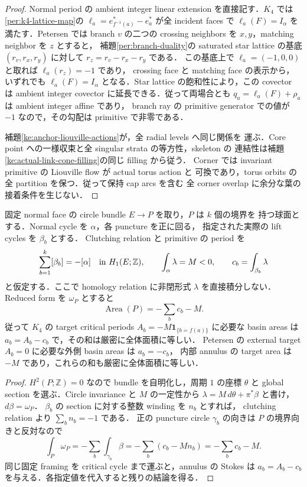 \begin{proof}
Normal period の ambient integer linear extension を直接記す．$K_4$ では
\eqref{per:k4-lattice-map}の
$\ell_a=e^*_{f^{-1}(a)}-e^*_a$ が全 incident faces で
$\ell_a(F)=I_\alpha$ を満たす．Petersen では branch $v$ の二つの crossing
neighbors を $x,y$，matching neighbor を $z$ とすると，
補題\ref{per:branch-duality}の saturated star lattice の基底
$(r_v,r_x,r_y)$ に対して $r_z=r_v-r_x-r_y$ である．
この基底上で $\ell_a=(-1,0,0)$ と取れば $\ell_a(r_z)=-1$ であり，
crossing face と matching face の表示から，いずれでも
$\ell_a(F)=I_\alpha$ となる．Star lattice の飽和性により，この covector は
ambient integer covector に延長できる．従って両場合とも
$q_a=\ell_a(F)+\rho_a$ は ambient integer affine であり，
branch ray の primitive generator での値が $-1$ なので，その勾配は primitive
で非零である．

補題\ref{ke:anchor-liouville-actions}が，全 radial levels へ同じ関係を
運ぶ．Core point への一様収束と全 singular strata の等方性，skeleton の
連結性は補題\ref{ke:actual-link-cone-filling}の同じ filling から従う．
Corner では invariant primitive の Liouville flow が actual torus action と
可換であり，torus orbits の全 partition を保つ．従って保持 cap arcs を含む
全 corner overlap に余分な葉の接着条件を生じない．
\end{proof}

\begin{lemma}
\label{ke:anchor-stokes-budget}
固定 normal face の circle bundle $E\to P$ を取り，$P$ は $k$ 個の境界を
持つ球面とする．Normal cycle を $\alpha$，各 puncture を正に回る，
指定された実際の lift cycles を $\beta_b$ とする．
Clutching relation と primitive の period を
\[
 \sum_{b=1}^k[\beta_b]=-[\alpha]\quad\hbox{in }H_1(E;\mathbb Z),
 \qquad \int_\alpha\lambda=M<0,\qquad
 c_b=\int_{\beta_b}\lambda
\]
と仮定する．ここで homology relation に非閉形式 $\lambda$ を直接積分しない．
Reduced form を $\omega_P$ とすると
\begin{equation}\label{ke:eq:anchor-area-total}
 \operatorname{Area}(P)=-\sum_bc_b-M.
\end{equation}
従って $K_4$ の target critical periods
$A_b=-M\mathbf1_{\{b=f(a)\}}$ に必要な basin areas は
$a_b=A_b-c_b$ で，その和は厳密に全体面積に等しい．
Petersen の external target $A_b=0$ に必要な外側 basin areas は $a_b=-c_b$，
内部 annulus の target area は $-M$ であり，これらの和も厳密に全体面積に等しい．
\end{lemma}

\begin{proof}
$H^2(P;\mathbb Z)=0$ なので bundle を自明化し，周期 $1$ の座標 $\theta$ と
global section を選ぶ．Circle invariance と $M$ の一定性から
$\lambda=M\,d\theta+\pi^*\beta$ と書け，$d\beta=\omega_P$．
$\beta_b$ の section に対する整数 winding を $n_b$ とすれば，
clutching relation より $\sum_bn_b=-1$ である．
正の puncture circle $\gamma_b$ の向きは $P$ の境界向きと反対なので
\[
 \int_P\omega_P=-\sum_b\int_{\gamma_b}\beta
 =-\sum_b(c_b-Mn_b)=-\sum_bc_b-M.
\]
同じ固定 framing を critical cycle まで運ぶと，annulus の Stokes は
$a_b=A_b-c_b$ を与える．各指定値を代入すると残りの結論を得る．
\end{proof}

